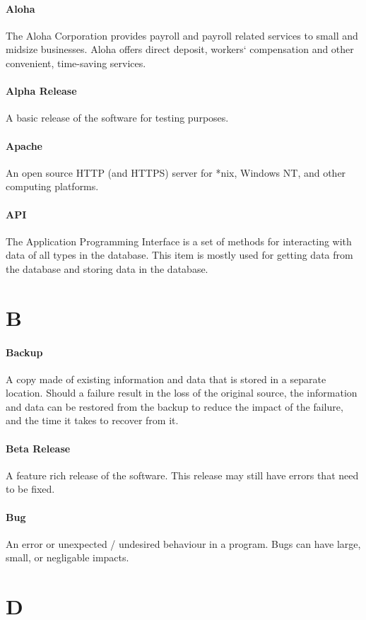 \documentclass[letterpaper,12pt]{report}
\begin{document}
\paragraph{Aloha} The Aloha Corporation provides payroll and payroll related services to small and midsize businesses. Aloha offers direct deposit, workers` compensation and other convenient, time-saving services.
\paragraph{Alpha Release} A basic release of the software for testing purposes.
\paragraph{Apache} An open source HTTP (and HTTPS) server for *nix, Windows NT, and other computing platforms.
\paragraph{API} The Application Programming Interface is a set of methods for interacting with data of all types in the database. This item is mostly used for getting data from the database and storing data in the database.
\section*{B}
\paragraph{Backup} A copy made of existing information and data that is stored in a separate location. Should a failure result in the loss of the original source, the information and data can be restored from the backup to reduce the impact of the failure, and the time it takes to recover from it.
\paragraph{Beta Release} A feature rich release of the software. This release may still have errors that need to be fixed.
\paragraph{Bug} An error or unexpected / undesired behaviour in a program. Bugs can have large, small, or negligable impacts.
\section*{D}
\end{document}
